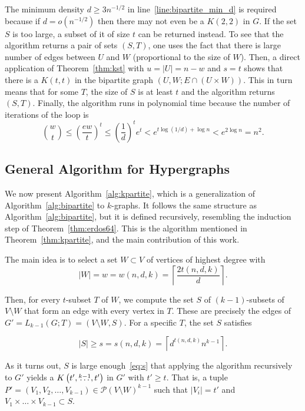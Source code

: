 The minimum density $d \geq 3n^{-1/2}$ in line~\ref{line:bipartite_min_d} is required
because if $d = o\left(n^{-1/2}\right)$ then
there may not even be a $K(2, 2)$ in $G$.
If the set $S$ is too large, a subset of it of size $t$ can be returned instead.
To see that the algorithm returns a pair of sets $(S, T)$, one uses the fact that
there is large number of edges between $U$ and $W$ (proportional to the size of $W$).
Then, a direct application of Theorem~\ref{thm:kst}
with $u = |U| = n - w$ and $s = t$ shows that
there is a $K(t, t)$ in the bipartite graph $(U, W; E \cap (U \times W))$.
This in turn means that for some $T$,
the size of $S$ is at least $t$
and the algorithm returns $(S, T)$.
Finally, the algorithm runs in polynomial time because 
the  number of iterations of the loop is
\[
    \binom{w}{t} \leq
    \left(\frac{ew}{t}\right)^t \leq
    \left(\frac{1}{d}\right)^t e^t < e^{t \log (1/d) + \log n} <
    e^{2\log n} = n^2.
\]

\subsection{General Algorithm for Hypergraphs} \label{subsec:algorithm-for-k-graphs}

We now present Algorithm~\ref{alg:kpartite}, which is
a generalization of Algorithm~\ref{alg:bipartite} to $k$-graphs.
It follows the same structure as Algorithm~\ref{alg:bipartite},
but it is defined recursively, resembling the induction step of Theorem~\ref{thm:erdos64}.
This is the algorithm mentioned in Theorem~\ref{thm:kpartite},
and the main contribution of this work.

The main idea is to select a set $W \subset V$ of vertices of highest degree with
\begin{equation}
    \label{eq:w}
    |W| = w = w(n, d, k) = \left\lceil \frac{2t(n, d, k)}{d} \right\rceil.
\end{equation}

Then, for every $t$-subset $T$ of $W$, we compute the set $S$ of $(k-1)$-subsets of $V \setminus W$
that form an edge with every vertex in $T$.
These are precisely the edges of $G' = L_{k-1}(G; T) = (V \setminus W, S)$.
For a specific $T$, the set $S$ satisfies

\begin{equation}
    \label{eq:s}
    |S| \geq s = s(n, d, k) = \left\lceil d^{t(n, d, k)} n^{k-1} \right\rceil.
\end{equation}

As it turns out, $S$ is large enough~\eqref{eq:s}
that applying the algorithm recursively to $G'$
yields a $K\left(t', \overset{k-1}{\dots}, t'\right)$ in $G'$ with $t' \geq t$.
That is, a tuple
$P' = (V_1, V_2, \dots, V_{k-1}) \in \mathcal{P}(V \setminus W)^{k-1}$ such that $|V_i| = t'$ and
$V_1 \times \dots \times V_{k-1}\subset S$.

